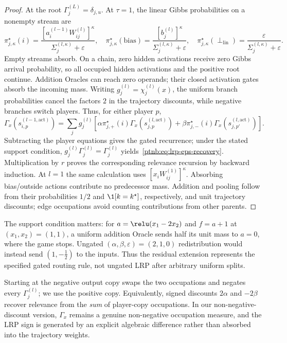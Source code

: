\begin{proof}
At the root $\Gamma_j^{(L)}=\delta_{j,u}$. At $\tau=1$, the linear Gibbs probabilities on a nonempty stream are
\begin{equation}\label{ptnb:eq:lrp-eps-policy}
 \pi_{j,\kappa}^\star(i)=\frac{[a_i^{(l-1)}W_{ij}^{(l)}]^\kappa}{\Sigma_j^{(l,\kappa)}+\varepsilon},\quad
 \pi_{j,\kappa}^\star(\mathrm{bias})=\frac{[b_j^{(l)}]^\kappa}{\Sigma_j^{(l,\kappa)}+\varepsilon},\quad
 \pi_{j,\kappa}^\star(\perp_{\mathrm{lin}})=\frac{\varepsilon}{\Sigma_j^{(l,\kappa)}+\varepsilon}.
\end{equation}
Empty streams absorb. On a chain, zero hidden activations receive zero Gibbs arrival probability, so all occupied hidden activations and the positive root continue. Addition Oracles can reach zero operands; their closed activation gates absorb the incoming mass. Writing $g_j^{(l)}=\chi_j^{(l)}(x)$, the uniform branch probabilities cancel the factors $2$ in the trajectory discounts, while negative branches switch players. Thus, for either player $p$,
\begin{equation}\label{ptnb:eq:routing-per-state-recursion}
 \Gamma_x(s_{i,p}^{(l-1,\mathrm{act})})=\sum_j g_j^{(l)}\left[
 \alpha\pi_{j,+}^\star(i)\Gamma_x(s_{j,p}^{(l,\mathrm{act})})+
 \beta\pi_{j,-}^\star(i)\Gamma_x(s_{j,p'}^{(l,\mathrm{act})})\right].
\end{equation}
Subtracting the player equations gives the gated recurrence; under the stated support condition, $g_j^{(l)}\Gamma_j^{(l)}=\Gamma_j^{(l)}$ yields~\eqref{ptnb:eq:lrp-eps-recovery}. Multiplication by $r$ proves the corresponding relevance recursion by backward induction. At $l=1$ the same calculation uses $[x_iW_{ij}^{(1)}]^\kappa$. Absorbing bias/outside actions contribute no predecessor mass. Addition and pooling follow from their probabilities $1/2$ and $\1[k=k^\star]$, respectively, and unit trajectory discounts; edge occupations avoid counting contributions from other parents.
\end{proof}
The support condition matters: for $a=\relu(x_1-2x_2)$ and $f=a+1$ at $(x_1,x_2)=(1,1)$, a uniform addition Oracle sends half its unit mass to $a=0$, where the game stops. Ungated $(\alpha,\beta,\varepsilon)=(2,1,0)$ redistribution would instead send $(1,-\tfrac12)$ to the inputs. Thus the residual extension represents the specified gated routing rule, not ungated LRP after arbitrary uniform splits.

\begin{remark}\label{ptnb:rem:starting-player}\label{ptnb:rem:signed-discount-alt}
Starting at the negative output copy swaps the two occupations and negates every $\Gamma_j^{(l)}$; we use the positive copy. Equivalently, signed discounts $2\alpha$ and $-2\beta$ recover relevance from the \emph{sum} of player-copy occupations. In our non-negative-discount version, $\Gamma_x$ remains a genuine non-negative occupation measure, and the LRP sign is generated by an explicit algebraic difference rather than absorbed into the trajectory weights.
\end{remark}


